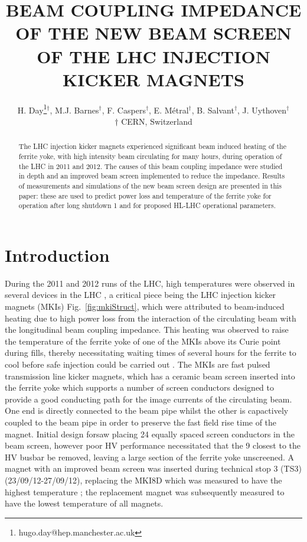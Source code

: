 \documentclass[a4paper,
              ]{jacow}
\begin{document}
\title{BEAM COUPLING IMPEDANCE OF THE NEW BEAM SCREEN OF THE LHC INJECTION KICKER MAGNETS}
\author{H. Day\thanks{hugo.day@hep.manchester.ac.uk}$^{\dagger}$, M.J. Barnes$^{\dagger}$, F. Caspers$^{\dagger}$, E. Métral$^{\dagger}$, B. Salvant$^{\dagger}$, J. Uythoven$^{\dagger}$ \\
$\dagger$ CERN, Switzerland
}

\maketitle 


\begin{abstract}
The LHC injection kicker magnets experienced significant beam induced heating of the ferrite yoke, with high intensity beam circulating for many hours, during operation of the LHC in 2011 and 2012. The causes of this beam coupling impedance were studied in depth and an improved beam screen implemented to reduce the impedance. Results of measurements and simulations of the new beam screen design are presented in this paper: these are used to predict power loss and temperature of the ferrite yoke for operation after long shutdown 1 and for proposed HL-LHC operational parameters.
\end{abstract}

\section{Introduction}

During the 2011 and 2012 runs of the LHC, high temperatures were observed in several devices in the LHC  \cite{metral_cham2012}, a critical piece being the LHC injection kicker magnets (MKIs) Fig.~\ref{fig:mkiStruct}, which were attributed to beam-induced heating due to high power loss from the interaction of the circulating beam with the longitudinal beam coupling impedance. This heating was observed to raise the temperature of the ferrite yoke of one of the MKIs above its Curie point during fills, thereby necessitating waiting times of several hours for the ferrite to cool before safe injection could be carried out \cite{mki-heating}. The MKIs are fast pulsed transmission line kicker magnets, which has a ceramic beam screen inserted into the ferrite yoke which supports a number of screen conductors designed to provide a good conducting path for the image currents of the circulating beam. One end is directly connected to the beam pipe whilst the other is capactively coupled to the beam pipe in order to preserve the fast field rise time of the magnet. Initial design forsaw placing 24 equally spaced screen conductors in the beam screen, however poor HV performance necessitated that the 9 closest to the HV busbar be removed, leaving a large section of the ferrite yoke unscreened. A magnet with an improved beam screen was inserted during technical stop 3 (TS3) (23/09/12-27/09/12), replacing the MKI8D which was measured to have the highest temperature \cite{mki-heatingTemp}; the replacement magnet was subsequently measured to have the lowest temperature of all magnets.
\end{document}
